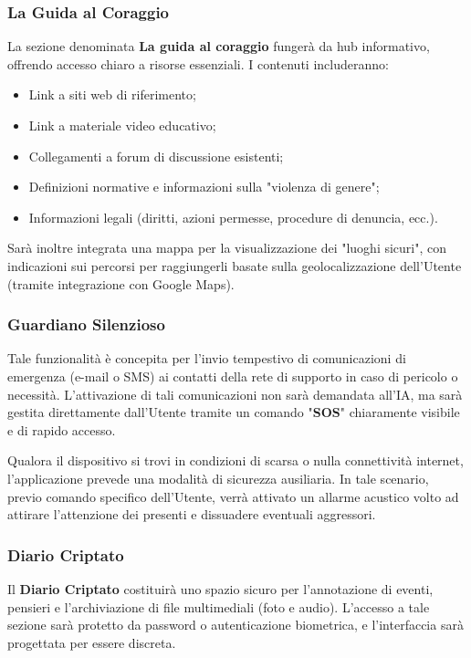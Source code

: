 \documentclass[a4paper,12pt]{article}
\begin{document}
\subsubsection{La Guida al Coraggio}
La sezione denominata \textbf{La guida al coraggio} fungerà da hub informativo, offrendo accesso chiaro a risorse essenziali. I contenuti includeranno:
\begin{itemize}
    \item Link a siti web di riferimento;
    \item Link a materiale video educativo;
    \item Collegamenti a forum di discussione esistenti;
    \item Definizioni normative e informazioni sulla "violenza di genere";
    \item Informazioni legali (diritti, azioni permesse, procedure di denuncia, ecc.).
\end{itemize}
Sarà inoltre integrata una mappa per la visualizzazione dei "luoghi sicuri", con indicazioni sui percorsi per raggiungerli basate sulla geolocalizzazione dell'Utente (tramite integrazione con Google Maps).

\subsubsection{Guardiano Silenzioso}
Tale funzionalità è concepita per l'invio tempestivo di comunicazioni di emergenza (e-mail o SMS) ai contatti della rete di supporto in caso di pericolo o necessità. L'attivazione di tali comunicazioni non sarà demandata all'IA, ma sarà gestita direttamente dall'Utente tramite un comando "\textbf{SOS}" chiaramente visibile e di rapido accesso.

Qualora il dispositivo si trovi in condizioni di scarsa o nulla connettività internet, l'applicazione prevede una modalità di sicurezza ausiliaria. In tale scenario, previo comando specifico dell'Utente, verrà attivato un allarme acustico volto ad attirare l'attenzione dei presenti e dissuadere eventuali aggressori.

\subsubsection{Diario Criptato}
Il \textbf{Diario Criptato} costituirà uno spazio sicuro per l'annotazione di eventi, pensieri e l'archiviazione di file multimediali (foto e audio). L'accesso a tale sezione sarà protetto da password o autenticazione biometrica, e l'interfaccia sarà progettata per essere discreta.
\end{document}
